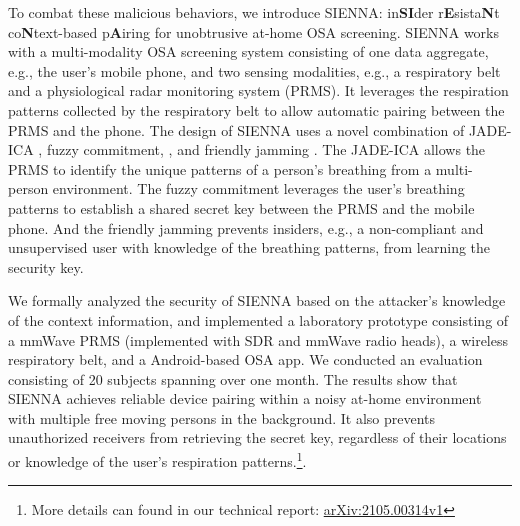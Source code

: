 
To combat these malicious behaviors, we introduce SIENNA: in\textbf{SI}der r\textbf{E}sista\textbf{N}t co\textbf{N}text-based p\textbf{A}iring for unobtrusive at-home OSA screening. SIENNA works with a multi-modality OSA screening system consisting of one data aggregate, e.g., the user's mobile phone, and two sensing modalities, e.g.,  a respiratory belt and a physiological radar monitoring system (PRMS). It leverages the respiration patterns collected by the respiratory belt to allow automatic pairing between the PRMS and the phone. The design of SIENNA uses a novel combination of JADE-ICA \cite{rutledge_independent_2013}, fuzzy commitment, \cite{JuelsFuzzyCommitmentScheme1999}, and friendly jamming \cite{AroraDialogCodesSecure2009,GollakotaPhysicalLayerWireless2011, MelcherIJamChannelRandomization2020}. The JADE-ICA allows the PRMS to identify the unique patterns of a person's breathing from a multi-person environment. The fuzzy commitment leverages the user's breathing patterns to establish a shared secret key between the PRMS and the mobile phone. And the friendly jamming prevents insiders, e.g., a non-compliant and unsupervised user with knowledge of the breathing patterns, from learning the security key.

We formally analyzed the security of SIENNA based on the attacker's knowledge of the context information, and implemented a laboratory prototype consisting of a mmWave PRMS (implemented with SDR and mmWave radio heads), a wireless respiratory belt, and a Android-based OSA app. We conducted an evaluation consisting of 20 subjects spanning over one month. The results show that SIENNA achieves reliable device pairing within a noisy at-home environment with multiple free moving persons in the background. It also prevents unauthorized receivers from retrieving the secret key, regardless of their locations or knowledge of the user's respiration patterns.\footnote{\label{tech_report}More details can found in our technical report:  \href{http://arxiv.org/abs/2105.00314}{arXiv:2105.00314v1}}.

